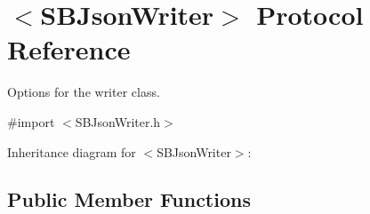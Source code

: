 \hypertarget{protocol_s_b_json_writer-p}{
\section{$<$\-S\-B\-Json\-Writer$>$ \-Protocol \-Reference}
\label{protocol_s_b_json_writer-p}
}


\-Options for the writer class.  




{\ttfamily \#import $<$\-S\-B\-Json\-Writer.\-h$>$}



\-Inheritance diagram for $<$\-S\-B\-Json\-Writer$>$\-:
\subsection*{\-Public \-Member \-Functions}
